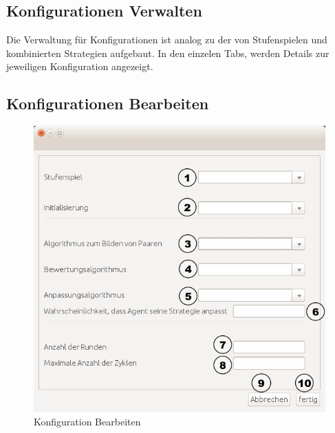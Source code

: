 \pagebreak

\subsection{Konfigurationen Verwalten}

Die Verwaltung für Konfigurationen ist analog zu der von Stufenspielen und kombinierten Strategien aufgebaut. In den einzelen Tabs, werden Details zur jeweiligen Konfiguration angezeigt.

\subsection{Konfigurationen Bearbeiten}

\begin{figure}[!hp] 
  \centering
     \includegraphics[width=1.0\textwidth]{GUI_Entwurf/KonfigurationBearbeiten.png}
  \caption{Konfiguration Bearbeiten}
  \label{fig:Bild2}
\end{figure}




